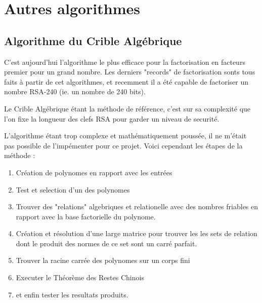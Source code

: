 \section{Autres algorithmes}
    \subsection{Algorithme du Crible Algébrique}
    
        C'est aujourd'hui l'algorithme le plus efficace pour la factorisation en facteurs premier pour un grand nombre.
        Les derniers "records" de factorisation sonts tous faits à partir de cet algorithmes, et recemment il a été capable de factoriser un nombre RSA-240 (ie. un nombre de 240 bits).
        
        Le Crible Algébrique étant la méthode de référence, c'est sur sa complexité que l'on fixe la longueur des clefs RSA pour garder un niveau de securité.
        
        L'algorithme étant trop complexe et mathématiquement poussée, il ne m'était pas possible de l'impémenter pour ce projet. Voici cependant les étapes de la méthode :
        
        \begin{enumerate}
            \item Création de polynomes en rapport avec les entrées
            \item Test et selection d'un des polynomes
            \item Trouver des "relations" algebriques et relationelle avec des nombres friables en rapport avec la base factorielle du polynome.
            \item Création et résolution d'une large matrice pour trouver les les sets de relation dont le produit des normes de ce set sont un carré parfait.
            \item Trouver la racine carrée des polynomes sur un corps fini
            \item Executer le Théorème des Restes Chinois
            \item et enfin tester les resultats produits.
        \end{enumerate}